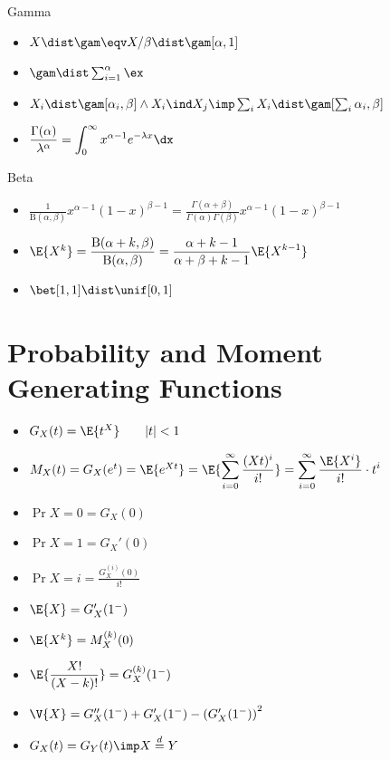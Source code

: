 \documentclass[landscape]{article}
\begin{document}
\begin{multicols*}{2}
Gamma
\begin{itemize}
  \item $X\dist\gam \eqv X/\beta \dist\gam[\alpha,1]$
  \item $\gam\dist \sum_{i=1}^\alpha\ex$
  \item $X_i\dist\gam[\alpha_i,\beta] \wedge X_i \ind X_j \imp
    \sum_i X_i\dist \gam[\sum_i \alpha_i,\beta]$
  \item $\displaystyle\frac{\Gamma(\alpha)}{\lambda^\alpha}
    = \displaystyle\int_0^\infty x^{\alpha-1} e^{-\lambda x} \dx$
\end{itemize}

Beta
\begin{itemize}
  \item $\displaystyle
    \frac{1}{\text{B}(\alpha,\beta)}x^{\alpha-1}(1-x)^{\beta-1}
    = \frac{\Gamma(\alpha+\beta)}{\Gamma(\alpha)\Gamma(\beta)}
    x^{\alpha-1}(1-x)^{\beta-1} $
  \item $\E{X^k}
    = \displaystyle\frac{\text{B}(\alpha+k,\beta)}{\text{B}(\alpha,\beta)}
    = \displaystyle\frac{\alpha+k-1}{\alpha+\beta+k-1}\E{X^{k-1}}$
  \item $\bet[1,1] \dist \unif[0,1]$
\end{itemize}

\section{Probability and Moment Generating Functions}

\begin{itemize}
  \item $G_X(t) = \E{t^X} \qquad |t| < 1$
  \item $M_X(t) = G_X(e^t) = \E{e^{Xt}}
    = \E{ \displaystyle\sum_{i=0}^\infty \frac{(Xt)^i}{i!}}
    = \displaystyle\sum_{i=0}^\infty \frac{\E{X^i}}{i!}\cdot t^i$
  \item $\Pr{X=0} = G_X(0)$
  \item $\Pr{X=1}=G_X'(0)$
  \item $\Pr{X=i} = \displaystyle\frac{G_X^{(i)}(0)}{i!}$
  \item $\E{X} = G_X'(1^-)$
  \item $\E{X^k} = M_X^{(k)}(0)$
  \item $\E{\displaystyle\frac{X!}{(X-k)!}} = G_X^{(k)}(1^-)$
  \item $\V{X} = G_X''(1^-) + G_X'(1^-)
    - \left(G_X'(1^-)\right)^2$
  \item $G_X(t) = G_Y(t) \imp X \stackrel{d}{=} Y$
\end{itemize}


\end{multicols*}
\end{document}
